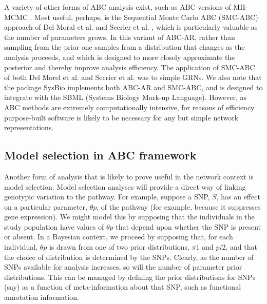 A variety of other forms of ABC analysis exist, such as ABC versions of MH-MCMC \cite{marjoram03}. Most useful, perhaps, is the Sequential Monte Carlo ABC (SMC-ABC) approach of Del Moral et al. \cite{delmoral06} and Secrier et al. \cite{secrier09}, which is particularly valuable as the number of parameters grows. In this variant of ABC-AR, rather than sampling from the prior one samples from a distribution that changes as the analysis proceeds, and which is designed to more closely approximate the posterior and thereby improve analysis efficiency. The application of SMC-ABC of both Del Morel et al. and Secrier et al. was to simple GRNs. We also note that the package SysBio \cite{Liepe2010} implements both ABC-AR and SMC-ABC, and is designed to integrate with the SBML (Systems Biology Mark-up Language). However, as ABC methods are extremely computationally intensive, for reasons of efficiency purpose-built software is likely to be necessary for any but simple network representations.

\subsection{Model selection in ABC framework}
Another form of analysis that is likely to prove useful in the network context is model selection. Model selection analyses will provide a direct way of linking genotypic variation to the pathway. For example, suppose a SNP, $S$, has an effect on a particular parameter, $\theta p$, of the pathway (for example, because it suppresses gene expression). We might model this by supposing that the individuals in the study population have values of $\theta p$ that depend upon whether the SNP is present or absent. In a Bayesian context, we proceed by supposing that, for each individual, $\theta p$ is drawn from one of two prior distributions, $\pi1$ and $pi2$, and that the choice of distribution is determined by the SNPs.
Clearly, as the number of SNPs available for analysis increases, so will the number of parameter prior distributions. This can be managed by defining the prior distributions for SNPs (say) as a function of meta-information about that SNP, such as functional annotation information.

